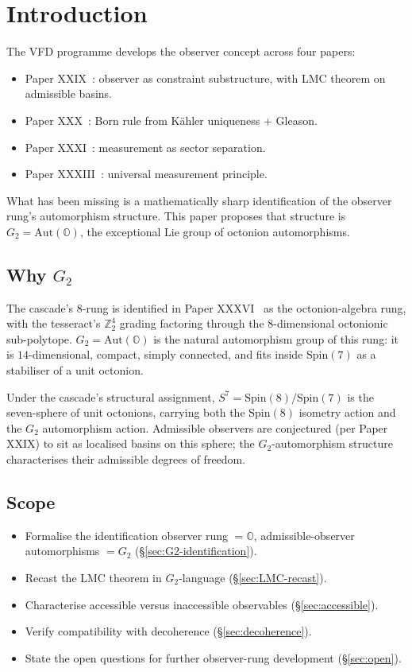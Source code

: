 \documentclass[12pt]{article}
\theoremstyle{definition}
\theoremstyle{remark}
\newcommand{\Oo}{\mathbb{O}}
\newcommand{\Gtwo}{G_2}
\newcommand{\Spin}{\mathrm{Spin}}
\newcommand{\Aut}{\mathrm{Aut}}
\begin{document}
\section{Introduction}\label{sec:intro}

The VFD programme develops the observer concept across four papers:
\begin{itemize}
\item Paper XXIX~\citep{SmartXXIX}: observer as constraint substructure, with LMC theorem on admissible basins.
\item Paper XXX~\citep{SmartXXX}: Born rule from K\"ahler uniqueness + Gleason.
\item Paper XXXI~\citep{SmartXXXI}: measurement as sector separation.
\item Paper XXXIII~\citep{SmartXXXIII}: universal measurement principle.
\end{itemize}
What has been missing is a mathematically sharp identification of the observer rung's automorphism structure. This paper proposes that structure is $\Gtwo = \Aut(\Oo)$, the exceptional Lie group of octonion automorphisms.

\subsection{Why $\Gtwo$}

The cascade's $8$-rung is identified in Paper XXXVI~\citep{SmartXXXVI} as the octonion-algebra rung, with the tesseract's $\mathbb{Z}_2^4$ grading factoring through the $8$-dimensional octonionic sub-polytope. $\Gtwo = \Aut(\Oo)$ is the natural automorphism group of this rung: it is $14$-dimensional, compact, simply connected, and fits inside $\Spin(7)$ as a stabiliser of a unit octonion.

Under the cascade's structural assignment, $S^7 = \Spin(8)/\Spin(7)$ is the seven-sphere of unit octonions, carrying both the $\Spin(8)$ isometry action and the $\Gtwo$ automorphism action. Admissible observers are conjectured (per Paper XXIX) to sit as localised basins on this sphere; the $\Gtwo$-automorphism structure characterises their admissible degrees of freedom.

\subsection{Scope}

\begin{itemize}
\item Formalise the identification observer rung $=\Oo$, admissible-observer automorphisms $=\Gtwo$ (\S\ref{sec:G2-identification}).
\item Recast the LMC theorem in $\Gtwo$-language (\S\ref{sec:LMC-recast}).
\item Characterise accessible versus inaccessible observables (\S\ref{sec:accessible}).
\item Verify compatibility with decoherence (\S\ref{sec:decoherence}).
\item State the open questions for further observer-rung development (\S\ref{sec:open}).
\end{itemize}
\end{document}
